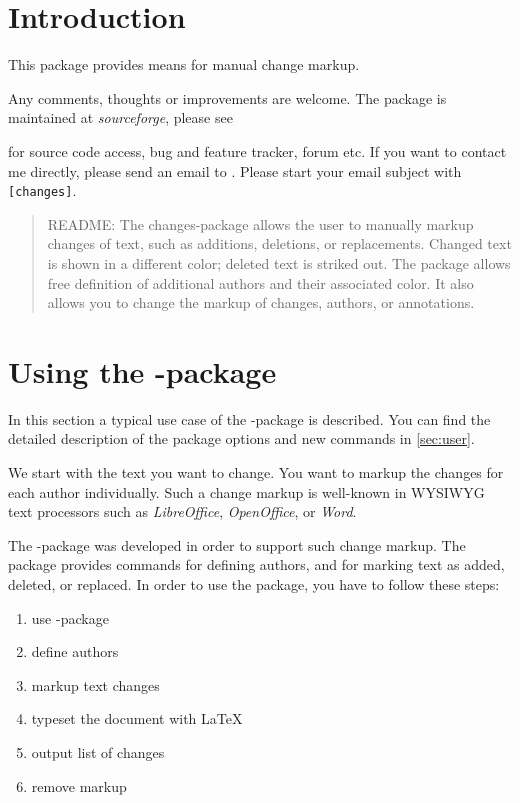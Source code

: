 \section{Introduction}

This package provides means for manual change markup.

Any comments, thoughts or improvements are welcome.
The package is maintained at \emph{sourceforge}, please see



for source code access, bug and feature tracker, forum etc.
If you want to contact me directly, please send an email to .
Please start your email subject with \texttt{[changes]}.

\begin{quote}
	\small\textsc{README:}
	The changes-package allows the user to manually markup changes of text, such as additions, deletions, or replacements.
	Changed text is shown in a different color; deleted text is striked out.
	The package allows free definition of additional authors and their associated color.
	It also allows you to change the markup of changes, authors, or annotations.
\end{quote}


\section{Using the -package}
\label{sec:usage}

In this section a typical use case of the -package is described.
You can find the detailed description of the package options and new commands in \autoref{sec:user}.

We start with the text you want to change.
You want to markup the changes for each author individually.
Such a change markup is well-known in WYSIWYG text processors such as \emph{LibreOffice}, \emph{OpenOffice}, or \emph{Word}.

The -package was developed in order to support such change markup.
The package provides commands for defining authors, and for marking text as added, deleted, or replaced.
In order to use the package, you have to follow these steps:

\begin{enumerate}
	\item use -package
	\item define authors
	\item markup text changes
	\item typeset the document with \LaTeX
	\item output list of changes
	\item remove markup
\end{enumerate}


